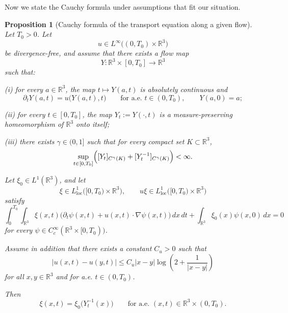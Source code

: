 \documentclass[reqno,11pt]{amsart}
\newtheorem{proposition}[theorem]{Proposition}
\begin{document}
Now we state the Cauchy formula under assumptions that fit our situation. 
\begin{proposition}[Cauchy formula of the transport equation along a given flow]
\label{prop:transport_by_flow}
Let $T_0>0$. Let
\[
u\in L^\infty\bigl((0,T_0)\times\mathbb R^3\bigr)
\]
be divergence-free, and assume that there exists a flow map
\[
Y:\mathbb R^3\times[0,T_0]\to\mathbb R^3
\]
such that:

\smallskip
\noindent
(i) for every $a\in\mathbb R^3$, the map $t\mapsto Y(a,t)$ is absolutely continuous and
\[
\partial_tY(a,t)=u\big(Y(a,t),t\big)
\qquad\text{for a.e. }t\in(0,T_0),
\qquad
Y(a,0)=a;
\]

\smallskip
\noindent
(ii) for every $t\in[0,T_0]$, the map $Y_t:=Y(\cdot,t)$ is a measure-preserving
homeomorphism of $\mathbb R^3$ onto itself;

\smallskip
\noindent
(iii) there exists $\gamma\in(0,1]$ such that for every compact set $K\subset\mathbb R^3$,
\[
\sup_{t\in[0,T_0]}
\Bigl(
[Y_t]_{C^\gamma(K)}+[Y_t^{-1}]_{C^\gamma(K)}
\Bigr)
<\infty .
\]

Let $\xi_0\in L^1(\mathbb R^3)$, and let
\[
\xi\in L^1_{\mathrm{loc}}\bigl([0,T_0)\times\mathbb R^3\bigr),
\qquad
u\xi\in L^1_{\mathrm{loc}}\bigl([0,T_0)\times\mathbb R^3\bigr)
\]
satisfy
\begin{equation}
\label{eq:transport_distributional_appendix}
\int_0^{T_0}\int_{\mathbb R^3}
\xi(x,t)\bigl(\partial_t\psi(x,t)+u(x,t)\cdot\nabla\psi(x,t)\bigr)\,dx\,dt
+\int_{\mathbb R^3}\xi_0(x)\psi(x,0)\,dx
=0
\end{equation}
for every $\psi\in C_c^\infty(\mathbb R^3\times[0,T_0))$.

Assume in addition that there exists a constant $C_u>0$ such that
\begin{equation}
\label{eq:u_loglip_appendix}
|u(x,t)-u(y,t)|
\le
C_u |x-y|\log\!\left(2+\frac{1}{|x-y|}\right)
\end{equation}
for all $x,y\in\mathbb R^3$ and for a.e. $t\in(0,T_0)$.

Then
\[
\xi(x,t)=\xi_0\bigl(Y_t^{-1}(x)\bigr)
\qquad
\text{for a.e. }(x,t)\in\mathbb R^3\times(0,T_0).
\]
\end{proposition}
\end{document}
